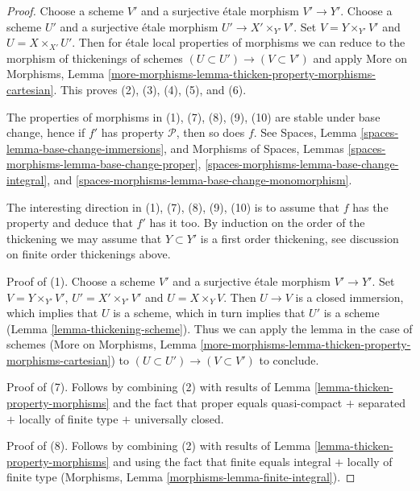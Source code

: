 \begin{proof}
Choose a scheme $V'$ and a surjective \'etale morphism $V' \to Y'$.
Choose a scheme $U'$ and a surjective \'etale morphism
$U' \to X' \times_{Y'} V'$. Set $V = Y \times_{Y'} V'$ and
$U = X \times_{X'} U'$. Then for \'etale local properties of morphisms
we can reduce to the morphism of thickenings of schemes
$(U \subset U') \to (V \subset V')$ and apply More on Morphisms, Lemma
\ref{more-morphisms-lemma-thicken-property-morphisms-cartesian}.
This proves (2), (3), (4), (5), and (6).

\medskip\noindent
The properties of morphisms in (1), (7), (8), (9), (10) are stable
under base change, hence if $f'$ has property $\mathcal{P}$, then so
does $f$. See
Spaces, Lemma \ref{spaces-lemma-base-change-immersions},
and
Morphisms of Spaces, Lemmas
\ref{spaces-morphisms-lemma-base-change-proper},
\ref{spaces-morphisms-lemma-base-change-integral}, and
\ref{spaces-morphisms-lemma-base-change-monomorphism}.

\medskip\noindent
The interesting direction in (1), (7), (8), (9), (10) is to assume
that $f$ has the property and deduce that $f'$ has it too.
By induction on the order of the thickening we may
assume that $Y \subset Y'$ is a first order thickening, see
discussion on finite order thickenings above.

\medskip\noindent
Proof of (1). Choose a scheme $V'$ and a surjective \'etale morphism
$V' \to Y'$. Set $V = Y \times_{Y'} V'$, $U' = X' \times_{Y'} V'$
and $U = X \times_Y V$. Then $U \to V$ is a closed immersion, which
implies that $U$ is a scheme, which in turn implies that $U'$ is
a scheme (Lemma \ref{lemma-thickening-scheme}). Thus we can apply
the lemma in the case of schemes
(More on Morphisms, Lemma
\ref{more-morphisms-lemma-thicken-property-morphisms-cartesian})
to $(U \subset U') \to (V \subset V')$ to conclude.

\medskip\noindent
Proof of (7). Follows by combining (2) with
results of Lemma \ref{lemma-thicken-property-morphisms}
and the fact that proper equals quasi-compact $+$
separated $+$ locally of finite type $+$ universally closed.

\medskip\noindent
Proof of (8). Follows by combining (2) with
results of Lemma \ref{lemma-thicken-property-morphisms}
and using the fact that finite equals integral $+$ locally
of finite type (Morphisms, Lemma \ref{morphisms-lemma-finite-integral}).


\end{proof}
